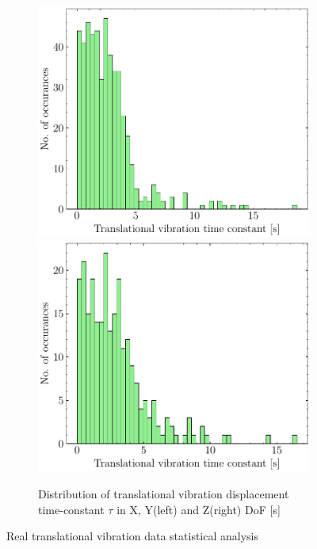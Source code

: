 \begin{figure}[H]
    \begin{subfigure}{\linewidth}
    \includegraphics[width=.5\linewidth]{images/fig_chapter4/data_dist/5.pdf}\hfill
    \includegraphics[width=.5\linewidth]{images/fig_chapter4/data_dist/6.pdf}
    \caption{Distribution of translational vibration displacement time-constant $ \tau $ in X, Y(left) and Z(right) DoF [s]}
    \end{subfigure}
\caption{Real translational vibration data statistical analysis}
\label{fig:dist_disp}
\end{figure}

